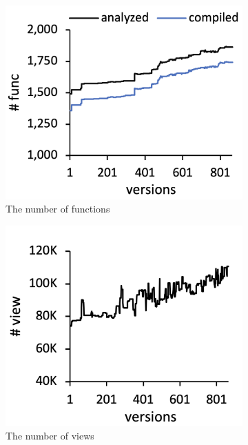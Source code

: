 \begin{figure}
  \centering
  \begin{subfigure}[b]{0.24\textwidth}
    \includegraphics[width=\textwidth]{img/func}
    \caption{The number of functions}
  \end{subfigure}
  \begin{subfigure}[b]{0.24\textwidth}
    \includegraphics[width=\textwidth]{img/view}
    \caption{The number of views}
  \end{subfigure}
  \begin{subfigure}[b]{0.24\textwidth}

\end{subfigure}
\end{figure}

